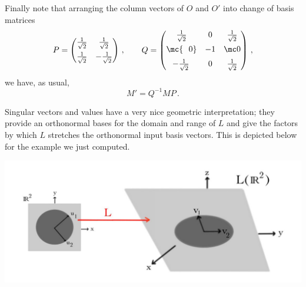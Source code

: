 \begin{example}
Finally note that arranging the column vectors of $O$ and $O'$ into change of basis matrices
\[
P=\begin{pmatrix}
\frac1{\sqrt{2}}&\frac1{\sqrt{2}}\\[2mm]
\frac1{\sqrt{2}}&-\frac1{\sqrt{2}}
\end{pmatrix}\, ,\qquad
Q=
\begin{pmatrix}
\frac1{\sqrt{2}}&0&\frac1{\sqrt{2}}\\[2mm]
\mc {\ \ 0}&-1&\mc 0\\[2mm]
\!-\frac1{\sqrt{2}}&0&\frac1{\sqrt{2}}
\end{pmatrix}\, ,
\]
we have, as usual,
\[
M'=Q^{-1}MP\, .
\]
\end{example}

Singular vectors and values have a very nice geometric interpretation; they provide an orthonormal bases for the domain and range of $L$
and give the factors by which $L$ stretches the orthonormal input basis vectors. This is depicted below for the example we just computed.
\begin{center}
\includegraphics[alt={The function L takes orthonormal vectors u1 and u2 to orthogonal vectors v1 and v2 in the plane L(R2).},scale=.27]{singval.jpg}
\end{center} 



